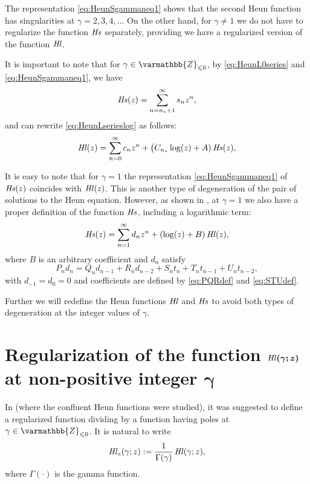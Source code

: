 \documentclass[11pt]{article}
\newcommand{\MF}[1]{\mathop{\mbox{$#1$}}\nolimits}
\newcommand{\Zzm}{\varmathbb{Z}_{\leqslant0}}%
\def\HeunL{\MF{\textit{Hl\/}}}%
\def\HeunS{\MF{\textit{Hs\/}}}%
\def\nst{n_{\scriptscriptstyle\star}}
\def\regsgnO{\scalebox{0.5}{\bf$\circledast$}}
\begin{document}
The representation \eqref{eq:HeunSgammaneq1} shows that the second Heun function has singularities at $\gamma=2,3,4,\ldots$
On the other hand, for $\gamma\neq1$ we do not have to regularize the function $\HeunS$ separately, providing we have a regularized version of the function $\HeunL$.

It is important to note that for $\gamma\in\Zzm$, by \eqref{eq:HeunL0series} and \eqref{eq:HeunSgammaneq1}, we have
\begin{equation}
  \HeunS(z)=\sum_{n=\nst+1}^{\infty}s_n z^n,
\label{eq:HeunSsergammanonpositive}
\end{equation}
and can rewrite \eqref{eq:HeunLserieslog} as follows:
\begin{equation}
\HeunL(z)=\sum_{n=0}^{\infty}c_n
z^n +\bigl(C_{\nst}\log(z)+A)
\HeunS(z),
\label{eq:HeunLserieslog'}
\end{equation}

It is easy to note that for $\gamma=1$ the representation \eqref{eq:HeunSgammaneq1} of $\HeunS(z)$  coincides with $\HeunL(z)$. This is another type of degeneration of the pair of solutions to the Heun equation. However, as shown in \cite{Mot15}, at $\gamma=1$ we also have a proper definition of the function $\HeunS$, including a logarithmic term:
\begin{equation}
\HeunS(z)=\sum_{n=1}^{\infty}d_n z^n+(\log(z)+B)\HeunL(z),
\label{eq:HeunSgamma=1ser}
\end{equation}
where $B$ is an arbitrary coefficient and $d_n$ satisfy
\begin{equation*}
P_n d_n=Q_n d_{n-1}+R_n d_{n-2}+ S_n t_{n}+T_n t_{n-1}+U_n t_{n-2},
\end{equation*}
with $d_{-1}=d_0=0$ and coefficients are defined by \eqref{eq:PQRdef} and \eqref{eq:STUdef}.

Further we will redefine the Heun functions $\HeunL$ and $\HeunS$ to avoid both types of degeneration at the integer values of $\gamma$.

\section{Regularization of the function $\bm{\HeunL(\gamma;z)}$ at non-positive integer $\bm\gamma$}

In \cite{Mot18} (where the confluent Heun functions were studied), it was suggested to define a regularized function dividing by a function having poles at \mbox{$\gamma\in\Zzm$}. It is natural to write
\[
\HeunL_{\regsgnO}(\gamma;z):=
\frac{1}{\Gamma(\gamma)}\HeunL(\gamma;z),
\]
where $\Gamma(\cdot)$ is the gamma function.
\end{document}

